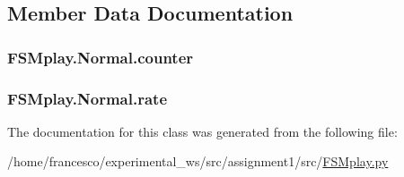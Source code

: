 \subsection{Member Data Documentation}
\subsubsection[{\texorpdfstring{counter}{counter}}]{\setlength{\rightskip}{0pt plus 5cm}F\+S\+Mplay.\+Normal.\+counter}\hypertarget{classFSMplay_1_1Normal_acbb61a2d3f054bd0e50ee54ba2c910c0}{}\label{classFSMplay_1_1Normal_acbb61a2d3f054bd0e50ee54ba2c910c0}
\subsubsection[{\texorpdfstring{rate}{rate}}]{\setlength{\rightskip}{0pt plus 5cm}F\+S\+Mplay.\+Normal.\+rate}\hypertarget{classFSMplay_1_1Normal_a62273aa35f449d8636797ce21dfd2aa2}{}\label{classFSMplay_1_1Normal_a62273aa35f449d8636797ce21dfd2aa2}


The documentation for this class was generated from the following file\+:\begin{DoxyCompactItemize}
\item 
/home/francesco/experimental\+\_\+ws/src/assignment1/src/\hyperlink{FSMplay_8py}{F\+S\+Mplay.\+py}\end{DoxyCompactItemize}
